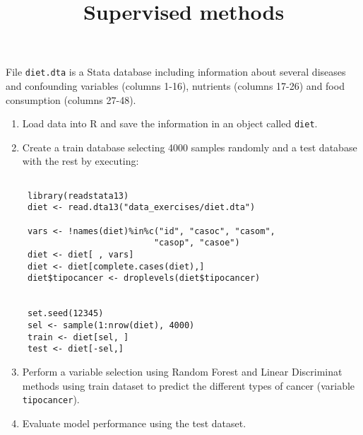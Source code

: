 \documentclass[11pt]{article}
\begin{document}
\title{\bf Supervised methods}
\date{}


\maketitle




 File {\tt diet.dta} is a Stata database including information about several diseases and confounding variables (columns 1-16), nutrients (columns 17-26) and food consumption (columns 27-48). 

 
\begin{enumerate}
 \item Load data into R and save the information in an object called {\tt diet}.
 \item Create a train database selecting 4000 samples randomly and a test database with the rest by executing:
 
 \begin{verbatim}

 library(readstata13)
 diet <- read.dta13("data_exercises/diet.dta")

 vars <- !names(diet)%in%c("id", "casoc", "casom", 
                          "casop", "casoe")
 diet <- diet[ , vars]
 diet <- diet[complete.cases(diet),]
 diet$tipocancer <- droplevels(diet$tipocancer)

 
 set.seed(12345) 
 sel <- sample(1:nrow(diet), 4000)
 train <- diet[sel, ]
 test <- diet[-sel,]
 \end{verbatim}
 
 \item Perform a variable selection using Random Forest and Linear Discriminat methods using train dataset to predict the different types
 of cancer (variable {\tt tipocancer}).
 \item Evaluate model performance using the test dataset. 
\end{enumerate}
 
\end{document}
